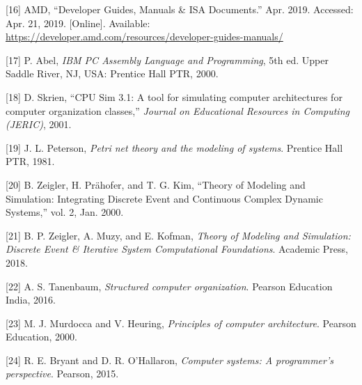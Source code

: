 \documentclass[12pt,oneside]{templates/unerthesis}
\newcommand{\CSLLeftMargin}[1]{#1} %
\newcommand{\CSLRightInline}[1]{#1} %
\newlength{\cslhangindent}
\newenvironment{CSLReferences}[2] %
 {\setlength{\parindent}{0pt}%
  \setlength{\leftskip}{#1 pt\relax}%
  \setlength{\parskip}{#2 pt\relax}%
  \everypar{\setlength{\hangindent}{\cslhangindent}}}
 {\par}
\begin{document}
\begin{CSLReferences}{0}{0}
\leavevmode{}%
\CSLLeftMargin{{[}16{]} }%
\CSLRightInline{AMD, {``Developer {Guides}, {Manuals} \& {ISA} {Documents}.''} Apr. 2019. Accessed: Apr. 21, 2019. {[}Online{]}. Available: \url{https://developer.amd.com/resources/developer-guides-manuals/}}

\leavevmode{}%
\CSLLeftMargin{{[}17{]} }%
\CSLRightInline{P. Abel, \emph{{IBM} {PC} {Assembly} {Language} and {Programming}}, 5th ed. Upper Saddle River, NJ, USA: Prentice Hall PTR, 2000.}

\leavevmode{}%
\CSLLeftMargin{{[}18{]} }%
\CSLRightInline{D. Skrien, {``{CPU} {Sim} 3.1: {A} tool for simulating computer architectures for computer organization classes,''} \emph{Journal on Educational Resources in Computing (JERIC)}, 2001.}

\leavevmode{}%
\CSLLeftMargin{{[}19{]} }%
\CSLRightInline{J. L. Peterson, \emph{Petri net theory and the modeling of systems}. Prentice Hall PTR, 1981.}

\leavevmode{}%
\CSLLeftMargin{{[}20{]} }%
\CSLRightInline{B. Zeigler, H. Prähofer, and T. G. Kim, {``Theory of {Modeling} and {Simulation}: {Integrating} {Discrete} {Event} and {Continuous} {Complex} {Dynamic} {Systems},''} vol. 2, Jan. 2000.}

\leavevmode{}%
\CSLLeftMargin{{[}21{]} }%
\CSLRightInline{B. P. Zeigler, A. Muzy, and E. Kofman, \emph{Theory of {Modeling} and {Simulation}: {Discrete} {Event} \& {Iterative} {System} {Computational} {Foundations}}. Academic Press, 2018.}

\leavevmode{}%
\CSLLeftMargin{{[}22{]} }%
\CSLRightInline{A. S. Tanenbaum, \emph{Structured computer organization}. Pearson Education India, 2016.}

\leavevmode{}%
\CSLLeftMargin{{[}23{]} }%
\CSLRightInline{M. J. Murdocca and V. Heuring, \emph{Principles of computer architecture}. Pearson Education, 2000.}

\leavevmode{}%
\CSLLeftMargin{{[}24{]} }%
\CSLRightInline{R. E. Bryant and D. R. O'Hallaron, \emph{Computer systems: A programmer's perspective}. Pearson, 2015.}


\end{CSLReferences}
\end{document}
